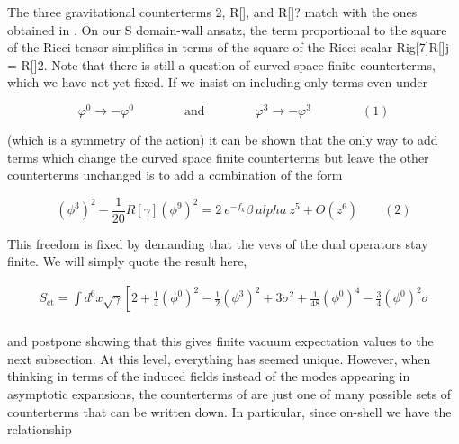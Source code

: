 \documentclass{article}
\begin{document}
\sloppy

The three gravitational counterterms 2, R[], and R[]? match with the ones obtained
in . On our S domain-wall ansatz, the term proportional to the square of the Ricci tensor
simplifies in terms of the square of the Ricci scalar Rig[7]R[]j = R[]2. Note that there is
still a question of curved space finite counterterms, which we have not yet fixed. If we insist
on including only terms even under


\begin{equation}
\varphi ^ { 0 } \rightarrow - \varphi ^ { 0 } \qquad \qquad \mathrm { a n d } \qquad \qquad \varphi ^ { 3 } \rightarrow - \varphi ^ { 3 } \qquad \qquad ( 1 )
\end{equation}


(which is a symmetry of the action) it can be shown that the only way to add terms which
change the curved space finite counterterms but leave the other counterterms unchanged is
to add a combination of the form


\begin{equation}
( \phi ^ { 3 } ) ^ { 2 } - \frac { 1 } { 2 0 } R [ \gamma ] ( \phi ^ { 9 } ) ^ { 2 } = 2 ~ e ^ { - f _ { k } } \beta ~ a l p h a ~ z ^ { 5 } + O ( z ^ { 6 } ) \qquad ( 2 )
\end{equation}


This freedom is fixed by demanding that the vevs of the dual operators stay finite. We will
simply quote the result here,


\begin{equation}
\begin{array} { c } { S _ { \mathrm { c t } } = \int d ^ { 6 } x \sqrt { \gamma } \left [ 2 + \frac { 1 } { 4 } \left ( \phi ^ { 0 } \right ) ^ { 2 } - \frac { 1 } { 2 } \left ( \phi ^ { 3 } \right ) ^ { 2 } + 3 \sigma ^ { 2 } + \frac { 1 } { 4 8 } \left ( \phi ^ { 0 } \right ) ^ { 4 } - \frac { 3 } { 4 } \left ( \phi ^ { 0 } \right ) ^ { 2 } \sigma \right. } \\ { ~ }\end{array}
\end{equation}


and postpone showing that this gives finite vacuum expectation values to the next subsection.
At this level, everything has seemed unique. However, when thinking in terms of the induced
fields instead of the modes appearing in asymptotic expansions, the counterterms of are just
one of many possible sets of counterterms that can be written down. In particular, since
on-shell we have the relationship
\end{document}
